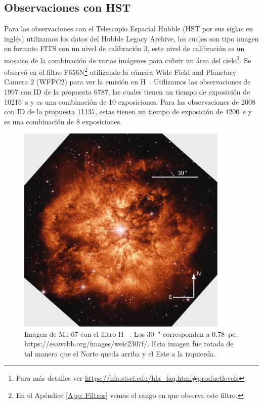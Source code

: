 \documentclass{book}
\begin{document}
\subsection{Observaciones con HST}

Para las observaciones con el Telescopio Espacial Hubble (HST por sus
siglas en inglés) utilizamos los datos del Hubble Legacy Archive, los
cuales son tipo imagen en formato FITS con un nivel de calibración 3,
este nivel de calibración es un mosaico de la combinación de varias
imágenes para cubrir un área del cielo\footnote{Para más detalles ver
  \url{https://hla.stsci.edu/hla_faq.html\#productlevels}}. Se observó
en el filtro F656N\footnote{En el Apéndice \ref{App: Filtros} vemos el
  rango en que observa este filtro.} utilizando la cámara Wide Field
and Planetary Camera 2 (WFPC2) para ver la emisión en \unit{H\alpha}.
Utilizamos las observaciones de 1997 con ID de la propuesta 6787, las
cuales tienen un tiempo de exposición de \SI{10 216}{s} y es una
combinación de 10 exposiciones. Para las observaciones de 2008 con ID
de la propuesta 11137, estas tienen un tiempo de exposición de
\SI{4200}{s} y es una combinación de 8
exposiciones. %

\begin{figure}[htb]
    \centering
    \includegraphics[width=0.9\textwidth]{ultimas correcciones/WR124_HST.pdf}
    \caption{Imagen de M1-67 con el filtro \unit{H\alpha}
      \citep{Grosdidier:1998}. Los \SI{30}{\arcsecond} corresponden a
      \SI{0.78}{pc}. https://esawebb.org/images/weic2307f/. Esta
      imagen fue rotada de tal manera que el Norte queda arriba y el
      Este a la izquierda.}
    \label{fig:M1-67HST}
\end{figure}
\end{document}
